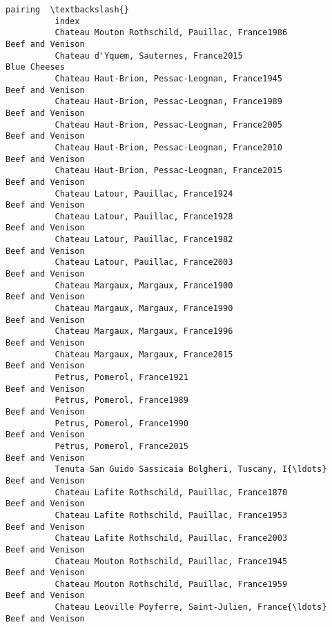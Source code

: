 \documentclass[11pt]{article}
\begin{document}
\begin{Verbatim}[commandchars=\\\{\}]
                                                                                   pairing  \textbackslash{}
          index                                                                              
          Chateau Mouton Rothschild, Pauillac, France1986                 Beef and Venison   
          Chateau d'Yquem, Sauternes, France2015                              Blue Cheeses   
          Chateau Haut-Brion, Pessac-Leognan, France1945                  Beef and Venison   
          Chateau Haut-Brion, Pessac-Leognan, France1989                  Beef and Venison   
          Chateau Haut-Brion, Pessac-Leognan, France2005                  Beef and Venison   
          Chateau Haut-Brion, Pessac-Leognan, France2010                  Beef and Venison   
          Chateau Haut-Brion, Pessac-Leognan, France2015                  Beef and Venison   
          Chateau Latour, Pauillac, France1924                            Beef and Venison   
          Chateau Latour, Pauillac, France1928                            Beef and Venison   
          Chateau Latour, Pauillac, France1982                            Beef and Venison   
          Chateau Latour, Pauillac, France2003                            Beef and Venison   
          Chateau Margaux, Margaux, France1900                            Beef and Venison   
          Chateau Margaux, Margaux, France1990                            Beef and Venison   
          Chateau Margaux, Margaux, France1996                            Beef and Venison   
          Chateau Margaux, Margaux, France2015                            Beef and Venison   
          Petrus, Pomerol, France1921                                     Beef and Venison   
          Petrus, Pomerol, France1989                                     Beef and Venison   
          Petrus, Pomerol, France1990                                     Beef and Venison   
          Petrus, Pomerol, France2015                                     Beef and Venison   
          Tenuta San Guido Sassicaia Bolgheri, Tuscany, I{\ldots}              Beef and Venison   
          Chateau Lafite Rothschild, Pauillac, France1870                 Beef and Venison   
          Chateau Lafite Rothschild, Pauillac, France1953                 Beef and Venison   
          Chateau Lafite Rothschild, Pauillac, France2003                 Beef and Venison   
          Chateau Mouton Rothschild, Pauillac, France1945                 Beef and Venison   
          Chateau Mouton Rothschild, Pauillac, France1959                 Beef and Venison   
          Chateau Leoville Poyferre, Saint-Julien, France{\ldots}              Beef and Venison   

\end{Verbatim}
\end{document}

